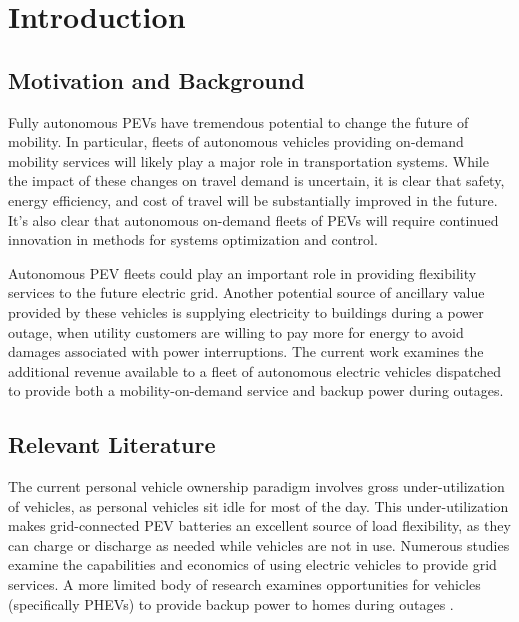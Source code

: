 \documentclass[journal]{IEEEtran}
\begin{document}
%
\IEEEpeerreviewmaketitle

\section{Introduction}

\subsection{Motivation and Background}
Fully autonomous PEVs have tremendous potential to change the future of mobility. In particular, fleets of autonomous vehicles providing on-demand mobility services will likely play a major role in transportation systems. While the impact of these changes on travel demand is uncertain, it is clear that safety, energy efficiency, and cost of travel will be substantially improved in the future. It's also clear that autonomous on-demand fleets of PEVs will require continued innovation in methods for systems optimization and control.

Autonomous PEV fleets could play an important role in providing flexibility services to the future electric grid. Another potential source of ancillary value provided by these vehicles is supplying electricity to buildings during a power outage, when utility customers are willing to pay more for energy to avoid damages associated with power interruptions. The current work examines the additional revenue available to a fleet of autonomous electric vehicles dispatched to provide both a mobility-on-demand service and backup power during outages.

\subsection{Relevant Literature}
The current personal vehicle ownership paradigm involves gross under-utilization of vehicles, as personal vehicles sit idle for most of the day. This under-utilization makes grid-connected PEV batteries an excellent source of load flexibility, as they can charge or discharge as needed while vehicles are not in use. Numerous studies examine the capabilities \cite{lefloch_pde_2016, lefloch_pde_2015, ota_autonomous_v2g, behrouz_2014} and economics \cite{ota_autonomous_v2g} of using electric vehicles to provide grid services. A more limited body of research examines opportunities for vehicles (specifically PHEVs) to provide backup power to homes during outages \cite{shin2016}.
\end{document}
